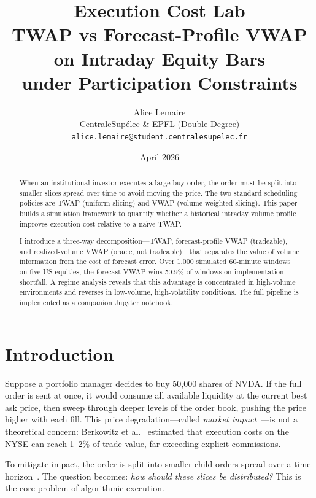 \documentclass[10pt,twocolumn]{article}
\title{\textbf{Execution Cost Lab}\\[4pt]
\large TWAP vs Forecast-Profile VWAP\\on Intraday Equity Bars\\
under Participation Constraints}
\author{Alice Lemaire\\
CentraleSup\'elec \& EPFL (Double Degree)\\
\texttt{alice.lemaire@student.centralesupelec.fr}}
\date{April 2026}
\begin{document}
\maketitle

\begin{abstract}
When an institutional investor executes a large buy order, the order must be split into smaller slices spread over time to avoid moving the price. The two standard scheduling policies are TWAP (uniform slicing) and VWAP (volume-weighted slicing). This paper builds a simulation framework to quantify whether a historical intraday volume profile improves execution cost relative to a na\"ive TWAP.

I introduce a three-way decomposition---TWAP, forecast-profile VWAP (tradeable), and realized-volume VWAP (oracle, not tradeable)---that separates the value of volume information from the cost of forecast error. Over 1{,}000 simulated 60-minute windows on five US equities, the forecast VWAP wins 50.9\% of windows on implementation shortfall. A regime analysis reveals that this advantage is concentrated in high-volume environments and reverses in low-volume, high-volatility conditions. The full pipeline is implemented as a companion Jupyter notebook.
\end{abstract}

\section{Introduction}

Suppose a portfolio manager decides to buy 50{,}000 shares of NVDA. If the full order is sent at once, it would consume all available liquidity at the current best ask price, then sweep through deeper levels of the order book, pushing the price higher with each fill. This price degradation---called \emph{market impact}~\cite{bouchaud2009}---is not a theoretical concern: Berkowitz et al.~\cite{berkowitz1988} estimated that execution costs on the NYSE can reach 1--2\% of trade value, far exceeding explicit commissions.

To mitigate impact, the order is split into smaller child orders spread over a time horizon~\cite{cartea2015}. The question becomes: \emph{how should these slices be distributed?} This is the core problem of algorithmic execution.
\end{document}
